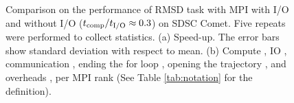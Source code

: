 \begin{figure}[ht!]
\caption{Comparison on the performance of RMSD task with MPI with I/O and without I/O (${t}_{\text{comp}}/{t}_{\text{I/O}} \approx 0.3$) on SDSC Comet.
Five repeats were performed to collect statistics. (a) Speed-up. The error bars show standard deviation with respect to mean.
(b) Compute \tcomp, IO \tIO, communication \tcomm, ending the for loop ,
  opening the trajectory , and overheads ,  per MPI rank (See Table \ref{tab:notation} for the definition).}
\label{fig:MPIwithoutIO}
\end{figure}
